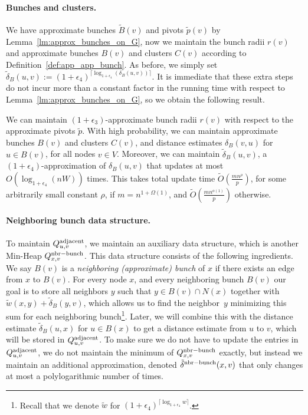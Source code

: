 \paragraph{Bunches and clusters.}
We have approximate bunches $\tilde B(v)$ and pivots $\tilde p(v)$ by Lemma~\ref{lm:approx_bunches_on_G}, now we maintain the bunch radii $r(v)$ and approximate bunches $B(v)$ and clusters $C(v)$ according to Definition~\ref{def:app_app_bunch}. 
As before, we simply set $\tilde \delta_B(u,v):= (1+\epsilon_4)^{\lceil\log_{1+\epsilon_4}(\delta_B(u,v))\rceil}$. It is immediate that these extra steps do not incur more than a constant factor in the running time with respect to Lemma~\ref{lm:approx_bunches_on_G}, so we obtain the following result. 

\begin{lemma}\label{lm:updatebunches}
    We can maintain $(1+\epsilon_3)$-approximate bunch radii $r(v)$ with respect to the approximate pivots $\tilde p$.
    With high probability, we can maintain approximate bunches $B(v)$ and clusters $C(v)$, and distance estimates $\delta_B(v,u)$ for $u\in B(v)$, for all nodes $v\in V$. Moreover, we can maintain $\tilde \delta_B(u,v)$, a $(1+\epsilon_4)$-approximation of $\delta_B(u,v)$ that updates at most $O(\log_{1+\epsilon_4}(nW))$ times. This takes total update time $ \tilde O (\tfrac{mn^\rho}{p}) $, for some arbitrarily small constant $\rho$, if $m=n^{1+\Omega(1)}$, and $\tilde O(\tfrac{mn^{o(1)}}{p})$ otherwise. 
\end{lemma}






\paragraph{Neighboring bunch data structure.} 
To maintain $Q^{\rm{adjacent}}_{u,v}$, we maintain an auxiliary data structure, which is another Min-Heap $Q^{\rm{nbr-bunch}}_{x,v}$. This data structure consists of the following ingredients. We say $B(v)$ is a \emph{neighboring (approximate) bunch} of $x$ if there exists an edge from $x$ to $B(v)$. For every node $ x $, and every neighboring bunch $ B (v) $ our goal is to store  all neighbors $ y $ such that $ y \in B (v) \cap N(x) $ together with $ \tilde w (x, y) + \tilde\delta_B(y, v) $, which allows us to find the neighbor~$ y $ minimizing this sum for each neighboring bunch\footnote{Recall that we denote $\tilde w$ for $(1+\epsilon_4)^{\lceil\log_{1+\epsilon_4}{w}\rceil}$.}. Later, we will combine this with the distance estimate $\tilde\delta_B(u,x)$ for $u\in B(x)$ to get a distance estimate from $u$ to $v$, which will be stored in $Q^{\rm{adjacent}}_{u,v}$. To make sure we do not have to update the entries in $Q^{\rm{adjacent}}_{u,v}$, we do not maintain the minimum of $Q^{\rm{nbr-bunch}}_{x,v}$ exactly, but instead we maintain an additional approximation, denoted $\tilde\delta^{\rm{nbr-bunch}}(x,v)$ that only changes at most a polylogarithmic number of times.

